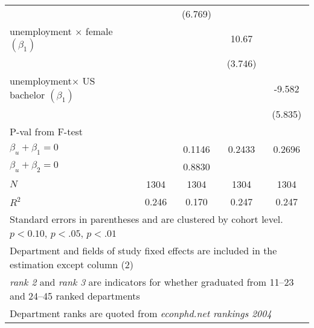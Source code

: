 \begin{table}[ht]
{\begin{tabular}{l*{4}{c}}
            &                     &     (6.769)         &                     &                     \\
[1em]
unemployment $\times$ female  $\left( \beta_1 \right)$&                     &                     &       10.67\sym{**} &                     \\
            &                     &                     &     (3.746)         &                     \\
[1em]
unemployment$\times$ US bachelor  $\left( \beta_1 \right)$&                     &                     &                     &      -9.582         \\
            &                     &                     &                     &     (5.835)         \\
\hline
P-val from F-test &\\
$\beta_u + \beta_1 = 0 $ &                 &        0.1146         &        0.2433         &        0.2696         \\
$\beta_u + \beta_2 = 0$ &                 &        0.8830         &                 &                 \\
\hline
\(N\)       &        1304         &        1304         &        1304         &        1304         \\
\(R^{2}\)   &       0.246         &       0.170         &       0.247         &       0.247         \\
\hline\hline
\multicolumn{5}{l}{\footnotesize Standard errors in parentheses and are clustered by cohort level. \sym{*} \(p<0.10\), \sym{**} \(p<.05\), \sym{***} \(p<.01\)}\\
\multicolumn{5}{l}{\footnotesize Department and fields of study fixed effects are included in the estimation  except column (2)}\\
\multicolumn{5}{l}{\footnotesize \textit{rank 2} and \textit{rank 3} are indicators for whether graduated from 11--23  and 24--45 ranked departments}\\
\multicolumn{5}{l}{\footnotesize Department ranks are quoted from \textit{econphd.net rankings 2004}}\\
\end{tabular}%
}
\end{table}

